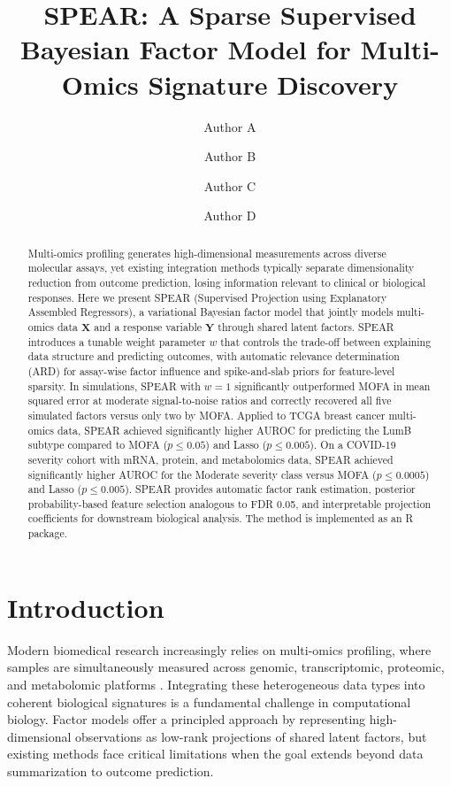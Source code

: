 \documentclass[11pt]{article}
\title{SPEAR: A Sparse Supervised Bayesian Factor Model for Multi-Omics Signature Discovery}
\author[1]{Author A}
\author[1]{Author B}
\author[2]{Author C}
\author[1,2]{Author D}
\affil[1]{Department of Immunobiology, Yale School of Medicine, New Haven, CT, USA}
\affil[2]{Department of Pathology, Yale School of Medicine, New Haven, CT, USA}
\date{}
\begin{document}
\maketitle

\begin{abstract}
Multi-omics profiling generates high-dimensional measurements across diverse molecular assays, yet existing integration methods typically separate dimensionality reduction from outcome prediction, losing information relevant to clinical or biological responses. Here we present SPEAR (Supervised Projection using Explanatory Assembled Regressors), a variational Bayesian factor model that jointly models multi-omics data $\mathbf{X}$ and a response variable $\mathbf{Y}$ through shared latent factors. SPEAR introduces a tunable weight parameter $w$ that controls the trade-off between explaining data structure and predicting outcomes, with automatic relevance determination (ARD) for assay-wise factor influence and spike-and-slab priors for feature-level sparsity. In simulations, SPEAR with $w=1$ significantly outperformed MOFA in mean squared error at moderate signal-to-noise ratios and correctly recovered all five simulated factors versus only two by MOFA. Applied to TCGA breast cancer multi-omics data, SPEAR achieved significantly higher AUROC for predicting the LumB subtype compared to MOFA ($p \leq 0.05$) and Lasso ($p \leq 0.005$). On a COVID-19 severity cohort with mRNA, protein, and metabolomics data, SPEAR achieved significantly higher AUROC for the Moderate severity class versus MOFA ($p \leq 0.0005$) and Lasso ($p \leq 0.005$). SPEAR provides automatic factor rank estimation, posterior probability-based feature selection analogous to FDR 0.05, and interpretable projection coefficients for downstream biological analysis. The method is implemented as an R package.
\end{abstract}

\section{Introduction}

Modern biomedical research increasingly relies on multi-omics profiling, where samples are simultaneously measured across genomic, transcriptomic, proteomic, and metabolomic platforms \citep{tcga2012breast, overmyer2021covid}. Integrating these heterogeneous data types into coherent biological signatures is a fundamental challenge in computational biology. Factor models offer a principled approach by representing high-dimensional observations as low-rank projections of shared latent factors, but existing methods face critical limitations when the goal extends beyond data summarization to outcome prediction.
\end{document}
